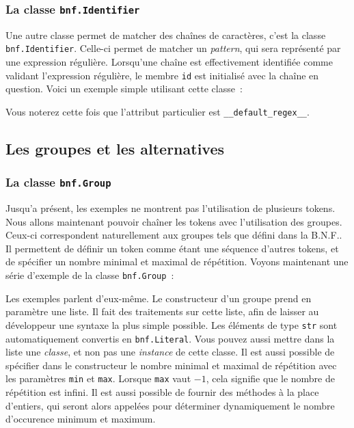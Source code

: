 \documentclass[a4paper]{article}
\newcommand{\fixed}[1]{\texttt{#1}}
\newcommand{\bnf}{B.N.F.}
\begin{document}
            \subsubsection{La classe \fixed{bnf.Identifier}}
                Une autre classe permet de matcher des chaînes de caractères,
                c'est la classe \fixed{bnf.Identifier}. Celle-ci permet de
                matcher un \emph{pattern}, qui sera représenté par une expression
                régulière. Lorsqu'une chaîne est effectivement identifiée comme
                validant l'expression régulière, le membre \fixed{id} est
                initialisé avec la chaîne en question.
                Voici un exemple simple utilisant cette classe~:

                Vous noterez cette fois que l'attribut particulier est
                \fixed{\_\_default\_regex\_\_}.

        \subsection{Les groupes et les alternatives}

            \subsubsection{La classe \fixed{bnf.Group}}
                Jusqu'a présent, les exemples ne montrent pas l'utilisation de
                plusieurs tokens. Nous allons maintenant pouvoir chaîner les
                tokens avec l'utilisation des groupes. Ceux-ci correspondent
                naturellement aux groupes tels que défini dans la \bnf. Il
                permettent de définir un token comme étant une séquence d'autres
                tokens, et de spécifier un nombre minimal et maximal de répétition.
                Voyons maintenant une série d'exemple de la classe \fixed{bnf.Group}~:

                Les exemples parlent d'eux-même. Le constructeur d'un groupe prend
                en paramètre une liste. Il fait des traitements sur cette liste,
                afin de laisser au développeur une syntaxe la plus simple possible.
                Les éléments de type \fixed{str} sont automatiquement convertis en
                \fixed{bnf.Literal}. Vous pouvez aussi mettre dans la liste une
                \emph{classe}, et non pas une \emph{instance} de cette classe.
                Il est aussi possible de spécifier dans le constructeur le
                nombre minimal et maximal de répétition avec les paramètres \fixed{min}
                et \fixed{max}. Lorsque \fixed{max}
                vaut $-1$, cela signifie que le nombre de répétition est infini.
                Il est aussi possible de fournir des méthodes à la place d'entiers,
                qui seront alors appelées pour déterminer dynamiquement le nombre
                d'occurence minimum et maximum.
\end{document}
